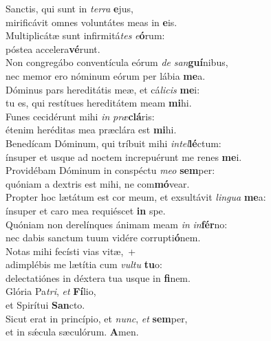 \evenverse Sanctis, qui sunt in \textit{ter}\textit{ra} \textbf{e}jus,~\*\\
\evenverse mirificávit omnes voluntátes meas in \textbf{e}is.\\
\oddverse Multiplicátæ sunt infirmitá\textit{tes} \textit{e}\textbf{ó}rum:~\*\\
\oddverse póstea accelera\textbf{vé}runt.\\
\evenverse Non congregábo conventícula eórum \textit{de} \textit{san}\textbf{guí}nibus,~\*\\
\evenverse nec memor ero nóminum eórum per lábia \textbf{me}a.\\
\oddverse Dóminus pars hereditátis meæ, et cá\textit{li}\textit{cis} \textbf{me}i:~\*\\
\oddverse tu es, qui restítues hereditátem meam \textbf{mi}hi.\\
\evenverse Funes cecidérunt mihi \textit{in} \textit{præ}\textbf{clá}ris:~\*\\
\evenverse étenim heréditas mea præclára est \textbf{mi}hi.\\
\oddverse Benedícam Dóminum, qui tríbuit mihi \textit{in}\textit{tel}\textbf{lé}ctum:~\*\\
\oddverse ínsuper et usque ad noctem increpuérunt me renes \textbf{me}i.\\
\evenverse Providébam Dóminum in conspéctu \textit{me}\textit{o} \textbf{sem}per:~\*\\
\evenverse quóniam a dextris est mihi, ne com\textbf{mó}vear.\\
\oddverse Propter hoc lætátum est cor meum, et exsultávit \textit{lin}\textit{gua} \textbf{me}a:~\*\\
\oddverse ínsuper et caro mea requiéscet \textbf{in} spe.\\
\evenverse Quóniam non derelínques ánimam meam \textit{in} \textit{in}\textbf{fér}no:~\*\\
\evenverse nec dabis sanctum tuum vidére corrupti\textbf{ó}nem.\\
\oddverse Notas mihi fecísti vias vitæ,~+\\
\oddverse  adimplébis me lætítia cum \textit{vul}\textit{tu} \textbf{tu}o:~\*\\
\oddverse delectatiónes in déxtera tua usque in \textbf{fi}nem.\\
\evenverse Glória Pa\textit{tri}, \textit{et} \textbf{Fí}lio,~\*\\
\evenverse et Spirítui \textbf{San}cto.\\
\oddverse Sicut erat in princípio, et \textit{nunc}, \textit{et} \textbf{sem}per,~\*\\
\oddverse et in sǽcula sæculórum. \textbf{A}men.\\
